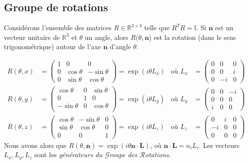 \documentclass[../notesdecours.tex]{subfiles}
\begin{document}
\subsection{Groupe de rotations}

Considérons l'ensemble des matrices $R \in \mathbb{R}^{3\times 3}$ telle que $R^TR = \mathbb{I}$. Si $\bm{n}$ est un vecteur unitaire de $\mathbb{R}^3$ et $\theta$ un angle, alors $R(\theta,\bm{n}$) est la rotation (dans le sens trigonométrique) autour de l'axe $\bm{n}$ d'angle $\theta$.

\begin{align*}
    R(\theta,x) &= \begin{pmatrix}
    1 & 0 & 0\\
    0 & \cos\theta & -\sin\theta\\
    0 & \sin\theta & \cos\theta
    \end{pmatrix} = \exp (i\theta L_x)			&\text{où } L_x &= \begin{pmatrix}
    0 & 0 & 0\\
    0 & 0 & i\\
    0 & -i & 0
    \end{pmatrix}\\
    R(\theta,y) &= \begin{pmatrix}
    \cos\theta & 0 & \sin\theta\\
    0 & 1 & 0\\
    -\sin\theta & 0 & \cos\theta\\
    \end{pmatrix} = \exp(i\theta L_y)		&\text{où } L_y &= \begin{pmatrix}
    0 & 0 & -i\\
    0 & 0 & 0\\
    i & 0 & 0
    \end{pmatrix}\\
    R(\theta,z) &= \begin{pmatrix}
    \cos\theta & -\sin\theta & 0\\
    \sin\theta & \cos\theta & 0\\
    0 & 0 & 1
    \end{pmatrix} = \exp(i\theta L_z)		&\text{où } L_z &= \begin{pmatrix}
    0 & i & 0\\
    -i & 0 & 0\\
    0 & 0 & 0
    \end{pmatrix}
\end{align*}
Nous avons alors que $R(\theta,\bm{n}) = \exp (i\theta\bm{n}\cdot\bm{L})$, où $\bm{n}\cdot\bm{L} = n_iL_i$. Les vecteurs $L_x,L_y,L_z$ sont les \emph{générateurs du $\mathcal{G}$roupe des $\mathcal{R}$otations}.
\end{document}
